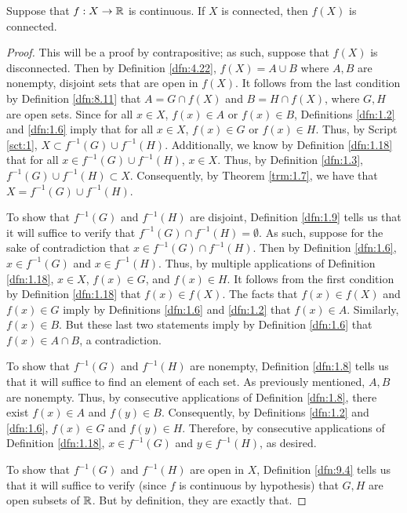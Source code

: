 \documentclass[../main.tex]{subfiles}
\begin{document}
\begin{theorem}\label{trm:9.11}
    Suppose that $f:X\to\mathbb{R}$ is continuous. If $X$ is connected, then $f(X)$ is connected.
    \begin{proof}
        This will be a proof by contrapositive; as such, suppose that $f(X)$ is disconnected. Then by Definition \ref{dfn:4.22}, $f(X)=A\cup B$ where $A,B$ are nonempty, disjoint sets that are open in $f(X)$. It follows from the last condition by Definition \ref{dfn:8.11} that $A=G\cap f(X)$ and $B=H\cap f(X)$, where $G,H$ are open sets. Since for all $x\in X$, $f(x)\in A$ or $f(x)\in B$, Definitions \ref{dfn:1.2} and \ref{dfn:1.6} imply that for all $x\in X$, $f(x)\in G$ or $f(x)\in H$. Thus, by Script \ref{sct:1}, $X\subset f^{-1}(G)\cup f^{-1}(H)$. Additionally, we know by Definition \ref{dfn:1.18} that for all $x\in f^{-1}(G)\cup f^{-1}(H)$, $x\in X$. Thus, by Definition \ref{dfn:1.3}, $f^{-1}(G)\cup f^{-1}(H)\subset X$. Consequently, by Theorem \ref{trm:1.7}, we have that $X=f^{-1}(G)\cup f^{-1}(H)$.\par\smallskip
        To show that $f^{-1}(G)$ and $f^{-1}(H)$ are disjoint, Definition \ref{dfn:1.9} tells us that it will suffice to verify that $f^{-1}(G)\cap f^{-1}(H)=\emptyset$. As such, suppose for the sake of contradiction that $x\in f^{-1}(G)\cap f^{-1}(H)$. Then by Definition \ref{dfn:1.6}, $x\in f^{-1}(G)$ and $x\in f^{-1}(H)$. Thus, by multiple applications of Definition \ref{dfn:1.18}, $x\in X$, $f(x)\in G$, and $f(x)\in H$. It follows from the first condition by Definition \ref{dfn:1.18} that $f(x)\in f(X)$. The facts that $f(x)\in f(X)$ and $f(x)\in G$ imply by Definitions \ref{dfn:1.6} and \ref{dfn:1.2} that $f(x)\in A$. Similarly, $f(x)\in B$. But these last two statements imply by Definition \ref{dfn:1.6} that $f(x)\in A\cap B$, a contradiction.\par
        To show that $f^{-1}(G)$ and $f^{-1}(H)$ are nonempty, Definition \ref{dfn:1.8} tells us that it will suffice to find an element of each set. As previously mentioned, $A,B$ are nonempty. Thus, by consecutive applications of Definition \ref{dfn:1.8}, there exist $f(x)\in A$ and $f(y)\in B$. Consequently, by Definitions \ref{dfn:1.2} and \ref{dfn:1.6}, $f(x)\in G$ and $f(y)\in H$. Therefore, by consecutive applications of Definition \ref{dfn:1.18}, $x\in f^{-1}(G)$ and $y\in f^{-1}(H)$, as desired.\par
        To show that $f^{-1}(G)$ and $f^{-1}(H)$ are open in $X$, Definition \ref{dfn:9.4} tells us that it will suffice to verify (since $f$ is continuous by hypothesis) that $G,H$ are open subsets of $\mathbb{R}$. But by definition, they are exactly that.
    \end{proof}
\end{theorem}
\end{document}
